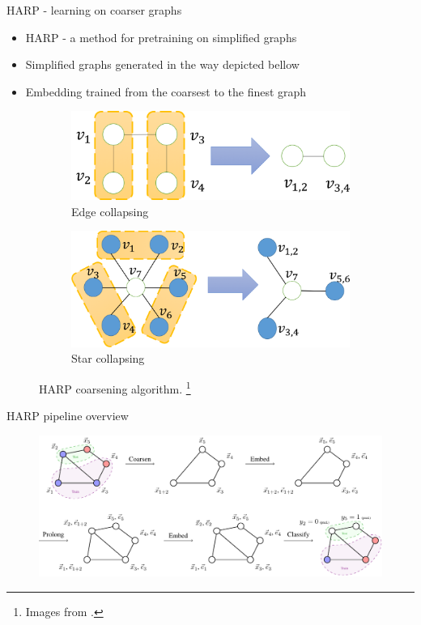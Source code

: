 \documentclass[10pt]{beamer}
\begin{document}
\begin{frame}{HARP - learning on coarser graphs}
	\begin{itemize}
		\item HARP - a method for pretraining on simplified graphs
		\item Simplified graphs generated in the way depicted bellow
		\item Embedding trained from the coarsest to the finest graph
	\end{itemize}
	\begin{figure}
		\centering
		\begin{subfigure}[t]{0.38\textwidth}
			\centering
			\includegraphics[width=\textwidth]{images/edge_collapsing.png}
			\caption{Edge collapsing}
		\end{subfigure}
		\hspace{2em}
		\begin{subfigure}[t]{0.38\textwidth}
			\centering
			\includegraphics[width=\textwidth]{images/star_collapsing.png}
			\caption{Star collapsing}
		\end{subfigure}
		\caption{HARP coarsening algorithm. \footnote{Images from \cite{chen_harp_2018}.}}
	\end{figure}
\end{frame}

\begin{frame}{HARP pipeline overview}
	\begin{figure}
		\centering
		\includegraphics[width=\textwidth]{images/harp-overview/harp-overview.pdf}
	\end{figure}
\end{frame}
\end{document}
